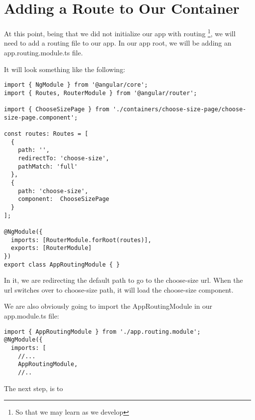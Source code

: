 \maketitle{}
\section{ Adding a Route to Our Container }

At this point, being that we did not initialize our app with routing
\footnote{So that we may learn as we develop}, we will need to add a routing
file to our app. In our app root, we will be adding an app.routing.module.ts
file.

It will look something like the following:
\begin{lstlisting}[caption=app.routing.module.ts file]
import { NgModule } from '@angular/core';
import { Routes, RouterModule } from '@angular/router';

import { ChooseSizePage } from './containers/choose-size-page/choose-size-page.component';

const routes: Routes = [
  {
    path: '',
    redirectTo: 'choose-size',
    pathMatch: 'full'
  },
  {
    path: 'choose-size',
    component:  ChooseSizePage
  }
];

@NgModule({
  imports: [RouterModule.forRoot(routes)],
  exports: [RouterModule]
})
export class AppRoutingModule { }
\end{lstlisting}

In it, we are redirecting the default path to go to the choose-size url. When
the url switches over to choose-size path, it will load the choose-size component.

We are also obviously going to import the AppRoutingModule in our app.module.ts
file:
\begin{lstlisting}[caption=app.module.ts file]
import { AppRoutingModule } from './app.routing.module';
@NgModule({
  imports: [
    //...
    AppRoutingModule,
    //..
\end{lstlisting}

The next step, is to 
